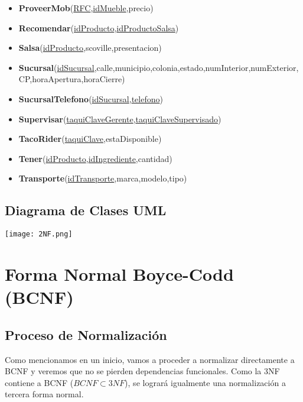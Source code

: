 \documentclass[11pt,letterpaper]{article}
\begin{document}
\begin{itemize}
\item \footnotesize{\textbf{ProveerMob}(\underline{RFC},\underline{idMueble},precio)}
\item \footnotesize{\textbf{Recomendar}(\underline{idProducto},\underline{idProductoSalsa})}
\item \footnotesize{\textbf{Salsa}(\underline{idProducto},scoville,presentacion)}
\item {\footnotesize \textbf{Sucursal}(\underline{idSucursal},calle,municipio,colonia,estado,numInterior,numExterior,CP,horaApertura,horaCierre)}
\item \footnotesize{\textbf{SucursalTelefono}(\underline{idSucursal},\underline{telefono})}
\item \footnotesize{\textbf{Supervisar}(\underline{taquiClaveGerente},\underline{taquiClaveSupervisado})}
\item \footnotesize{\textbf{TacoRider}(\underline{taquiClave},estaDisponible)}
\item \footnotesize{\textbf{Tener}(\underline{idProducto},\underline{idIngrediente},cantidad)}
\item \footnotesize{\textbf{Transporte}(\underline{idTransporte},marca,modelo,tipo)}



\end{itemize}


\subsection{Diagrama de Clases UML} 

\begin{landscape}
\begin{center}
\begin{minipage}{1\linewidth}
\texttt{[image: 2NF.png]}
\end{minipage}
\end{center}
\end{landscape}
\section{Forma Normal Boyce-Codd (BCNF)}

\subsection{Proceso de Normalización}
Como mencionamos en un inicio, vamos a proceder a normalizar directamente a BCNF y veremos que no se pierden dependencias funcionales. Como la 3NF contiene a BCNF ($BCNF\subset 3NF$), se logrará igualmente una normalización a tercera forma normal.\\
\end{document}

